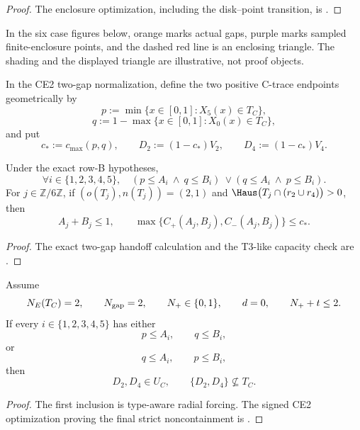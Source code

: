 

\begin{proof}
The enclosure optimization, including the disk--point transition, is
.
\end{proof}

In the six case figures below, orange marks actual gaps, purple marks sampled
finite-enclosure points, and the dashed red line is an enclosing triangle.
The shading and the displayed triangle are illustrative, not proof objects.


\FloatBarrier

In the CE2 two-gap normalization, define the two positive C-trace endpoints
geometrically by
\[
 p:=\min\{x\in[0,1]:X_5(x)\in T_C\},
\]
\[
 q:=1-\max\{x\in[0,1]:X_0(x)\in T_C\},
\]
and put
\[
 c_*:=c_{\max}(p,q),
 \qquad
 D_2:=(1-c_*)V_2,
 \qquad
 D_4:=(1-c_*)V_4.
\]

\begin{lemma}
\label{lem:new-two-gap-common-pair-adapter}
Under the exact row-B hypotheses,
\[
 \forall i\in\{1,2,3,4,5\},
 \quad
 (p\le A_i\ \land\ q\le B_i)
 \ \lor
 (q\le A_i\ \land\ p\le B_i).
\]
For \(j\in\mathbb Z/6\mathbb Z\), if \((o(T_j),n(T_j))=(2,1)\) and
\(\Haus\bigl(T_j\cap(r_2\cup r_4)\bigr)>0\), then
\[
 A_j+B_j\le1,
 \qquad
 \max\{C_+(A_j,B_j),C_-(A_j,B_j)\}\le c_*.
\]
\end{lemma}

\begin{proof}
The exact two-gap handoff calculation and the T3-like capacity check are
.
\end{proof}

\begin{theorem}
\label{thm:new-ce2-short-ray}
Assume
\[
 N_E(T_C)=2,
 \qquad
 N_{\rm gap}=2,
 \qquad
 N_+\in\{0,1\},
 \qquad
 d=0,
 \qquad
 N_++t\le2.
\]
If every \(i\in\{1,2,3,4,5\}\) has either
\[
 p\le A_i,\qquad q\le B_i,
\]
or
\[
 q\le A_i,\qquad p\le B_i,
\]
then
\[
 D_2,D_4\in U_C,
 \qquad
 \{D_2,D_4\}\nsubseteq T_C.
\]
\end{theorem}



\begin{proof}
The first inclusion is type-aware radial forcing.  The signed CE2
optimization proving the final strict noncontainment is
.
\end{proof}

